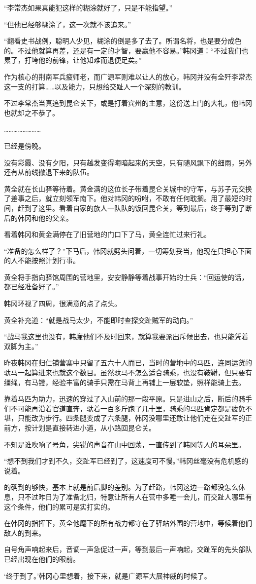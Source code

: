 “李常杰如果真能犯这样的糊涂就好了，只是不能指望。”

“但他已经够糊涂了，这一次就不该追来。”

“翻看史书战例，聪明人少见，糊涂的倒是多了去了。所谓名将，也是要分成色的。不过他就算再差，还是有一定的才智，要赢他不容易。”韩冈道：“不过我们也累了，打垮他的前锋，让他知难而退便足矣。”

作为核心的荆南军兵疲师老，而广源军则难以让人的放心，韩冈并没有全歼李常杰这一支的打算……以及能力，只想给交趾人一个深刻的教训。

不过李常杰当真追到昆仑关下，或是打着宾州的主意，这份送上门的大礼，他韩冈也就却之不恭了。

……………………

已经是傍晚。

没有彩霞、没有夕阳，只有越发变得晦暗起来的天空，只有随风飘下的细雨，另外还有从前线撤退下来的队伍。

黄全就在长山驿等待着。黄金满的这位长子带着昆仑关城中的守军，与苏子元交换了差事之后，就立刻领军南下。他对韩冈的吩咐，不敢有任何耽搁。用了最短的时间，赶到了这里。看着自家的族人一队队的饭回昆仑关，等到最后，终于等到了断后的韩冈和他的父亲。

看着韩冈和黄金满停在了旧营地的门口下了马，黄全连忙过来行礼。

“准备的怎么样了？”下马后，韩冈就劈头问着，一切筹划妥当，他现在只担心下面的人不能按照计划行事。

黄全将手指向驿馆周围的营地里，安安静静等着战事开始的士兵：“回运使的话，都已经准备好了。”

韩冈环视了四周，很满意的点了点头。

黄全补充道：“就是战马太少，不能即时查探交趾贼军的动向。”

“战马我这里也没有，韩廉他们不及时回来，就算我要派出斥候出去，也只能凭着双脚为主。”

昨夜韩冈在归仁铺营寨中只留了五六十人而已，当时的营地中的马匹，连同运货的驮马一起算进来也就这个数目。虽然驮马不怎么适合骑乘，也没有鞍鞯，但只要有缰绳，有马镫，经验丰富的骑手只需在马背上再铺上一层软垫，照样能骑上去。

靠着马匹为助力，迅速的穿过了入山前的那一段平原。只是进山之后，断后的骑手们不可能再沿着官道直奔，驮着一百多斤跑了几十里，骑乘的马匹肯定都是疲惫不堪，只能改为步行。四条腿变成了六条腿，韩冈没哪里还敢让他们走在交趾军的正前方，按计划是直接转进小道，从小路回昆仑关。

不知是谁吹响了号角，尖锐的声音在山中回荡，一直传到了韩冈等人的耳朵里。

“想不到我们才到不久，交趾军已经到了，这速度可不慢。”韩冈丝毫没有危机感的说着。

的确到的够快，基本上就是前后脚的差别。为了赶路，韩冈这边一路都没怎么休息，只不过昨日为了准备北归，特意让所有人在营中多睡一会儿，而交趾人哪里有这个条件，他们的累可是实打实的。

在韩冈的指挥下，黄全他麾下的所有战力都守在了驿站外围的营地中，等候着他们敌人的到来。

自号角声响起来后，音调一声急促过一声，等到最后一声响起，交趾军的先头部队已经出现在他们的眼前。

‘终于到了。’韩冈心里想着，接下来，就是广源军大展神威的时候了。


